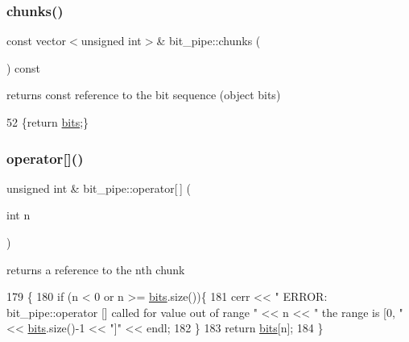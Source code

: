 \subsubsection{\texorpdfstring{chunks()}{chunks()}}
{\footnotesize\ttfamily const vector$<$unsigned int$>$\& bit\+\_\+pipe\+::chunks (\begin{DoxyParamCaption}{ }\end{DoxyParamCaption}) const\hspace{0.3cm}{\ttfamily [inline]}}



returns const reference to the bit sequence (object bits) 


\begin{DoxyCode}
52 \{\textcolor{keywordflow}{return} \hyperlink{classbit__pipe_a86f38af1e9736b053728033490476b50}{bits};\}
\end{DoxyCode}
\mbox{\label{classbit__pipe_a4ea1ac9d3b026ebf3f71a68fccd1d639}} 
\subsubsection{\texorpdfstring{operator[]()}{operator[]()}\hspace{0.1cm}{\footnotesize\ttfamily [1/2]}}
{\footnotesize\ttfamily unsigned int \& bit\+\_\+pipe\+::operator\mbox{[}$\,$\mbox{]} (\begin{DoxyParamCaption}\item[{int}]{n }\end{DoxyParamCaption})}



returns a reference to the nth chunk 


\begin{DoxyCode}
179                                         \{
180   \textcolor{keywordflow}{if} (n < 0 or n >= \hyperlink{classbit__pipe_a86f38af1e9736b053728033490476b50}{bits}.size())\{
181     cerr << \textcolor{stringliteral}{" ERROR: bit\_pipe::operator [] called for value out of range "} << n << \textcolor{stringliteral}{" the range is [0, "} << 
      \hyperlink{classbit__pipe_a86f38af1e9736b053728033490476b50}{bits}.size()-1 << \textcolor{stringliteral}{"]"} << endl;
182   \}
183   \textcolor{keywordflow}{return} \hyperlink{classbit__pipe_a86f38af1e9736b053728033490476b50}{bits}[n];
184 \}
\end{DoxyCode}
\mbox{\label{classbit__pipe_a58c67130ac4b0fd511998f991c8ad58d}} 

